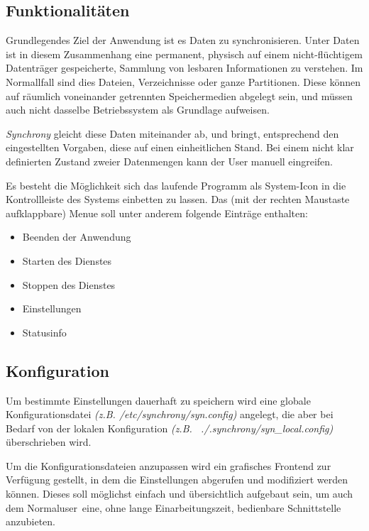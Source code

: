 \documentclass[12pt,oneside,a4paper,bibtotoc,liststotoc,pointlessnumbers]{scrartcl}
\begin{document}
\subsection{Funktionalitäten}
Grundlegendes Ziel der Anwendung ist es Daten zu synchronisieren. Unter Daten ist
in diesem Zusammenhang eine permanent, physisch auf einem nicht-fl\"{u}chtigem Datentr\"{a}ger
gespeicherte, Sammlung von lesbaren Informationen zu verstehen. Im Normallfall sind
dies Dateien, Verzeichnisse oder ganze Partitionen. Diese k\"{o}nnen auf r\"{a}umlich
voneinander getrennten Speichermedien abgelegt sein, und m\"{u}ssen auch nicht
dasselbe Betriebssystem als Grundlage aufweisen.\par
\emph{Synchrony} gleicht diese Daten miteinander ab, und bringt, entsprechend den
eingestellten Vorgaben, diese auf einen einheitlichen Stand. Bei einem nicht
klar definierten Zustand zweier Datenmengen kann der User manuell eingreifen.\par
Es besteht die M\"{o}glichkeit sich das laufende Programm als System-Icon in die
Kontrollleiste des Systems einbetten zu lassen. Das (mit der rechten Maustaste
aufklappbare) Menue soll unter anderem folgende Eintr\"{a}ge enthalten:
\begin{itemize}
\item Beenden der Anwendung
\item Starten des Dienstes
\item Stoppen des Dienstes
\item Einstellungen
\item Statusinfo
\end{itemize}

\subsection{Konfiguration}
Um bestimmte Einstellungen dauerhaft zu speichern wird eine globale
Konfigurationsdatei \emph{(z.B. /etc/synchrony/syn.config)} angelegt, die aber bei
Bedarf von der lokalen Konfiguration \emph{(z.B. ~./.synchrony/syn\_local.config)}
\"{u}berschrieben wird.\par
Um die Konfigurationsdateien anzupassen wird ein grafisches Frontend zur Verf\"{u}gung
gestellt, in dem die Einstellungen abgerufen und modifiziert werden k\"{o}nnen. Dieses
soll m\"{o}glichst einfach und \"{u}bersichtlich aufgebaut sein, um auch dem
\glqq Normaluser\grqq\ eine, ohne lange Einarbeitungszeit, bedienbare Schnittstelle anzubieten.

\newpage
\end{document}
